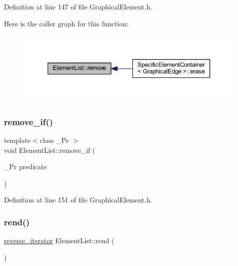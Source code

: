 Definition at line 147 of file Graphical\+Element.\+h.

Here is the caller graph for this function\+:
\nopagebreak
\begin{figure}[H]
\begin{center}
\leavevmode
\includegraphics[width=349pt]{class_element_list_a06b71e09b7ca85b416effbdac076ec49_icgraph}
\end{center}
\end{figure}
\mbox{\label{class_element_list_aa851e6d5b10920f2541d3dc0f5f2ee57}} 
\subsubsection{\texorpdfstring{remove\+\_\+if()}{remove\_if()}}
{\footnotesize\ttfamily template$<$class \+\_\+\+Pr $>$ \\
void Element\+List\+::remove\+\_\+if (\begin{DoxyParamCaption}\item[{\+\_\+\+Pr}]{predicate }\end{DoxyParamCaption})\hspace{0.3cm}{\ttfamily [inline]}}



Definition at line 151 of file Graphical\+Element.\+h.

\mbox{\label{class_element_list_a5c77af44a070ae80cddef7ce161e2f8b}} 
\subsubsection{\texorpdfstring{rend()}{rend()}}
{\footnotesize\ttfamily \hyperlink{class_element_list_a5a94d1e25a0deeb3f222dc12fa115174}{reverse\+\_\+iterator} Element\+List\+::rend (\begin{DoxyParamCaption}{ }\end{DoxyParamCaption})\hspace{0.3cm}{\ttfamily [inline]}}



